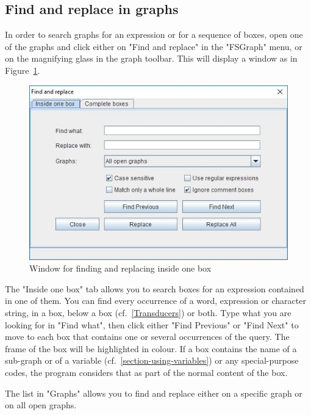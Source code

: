 \subsection{Find and replace in graphs}
\label{find-replace}
In order to search graphs for an expression or for a sequence of boxes, open one of
the graphs and click either on "Find and replace" in the "FSGraph" menu, or on the
magnifying glass in the graph toolbar. This will display a window as in
Figure~\ref{find-in-one-box}.

\noindent 
\begin{figure}[!ht]
\begin{center}
\includegraphics[width=13.6cm]{resources/img/findandreplace-one-box.jpg}
\caption{Window for finding and replacing inside one box\label{find-in-one-box}}
\end{center}
\end{figure}

\noindent The "Inside one box" tab allows you to search boxes for an expression
contained in one of them. You can find every occurrence of a word, expression or
character string, in a box, below a box (cf.~\ref{Transducers}) or both. Type what
you are looking for in "Find what", then click either "Find Previous" or "Find Next"
to move to each box that contains one or several occurrences of the query.
The frame of the box will be highlighted in colour. If a box contains the name of a
sub-graph or of a variable (cf.~\ref{section-using-variables}) or any special-purpose
codes, the program considers that as part of the normal content of the box.

\bigskip
\noindent The list in "Graphs" allows you to find and replace either on a specific graph
or on all open graphs.

